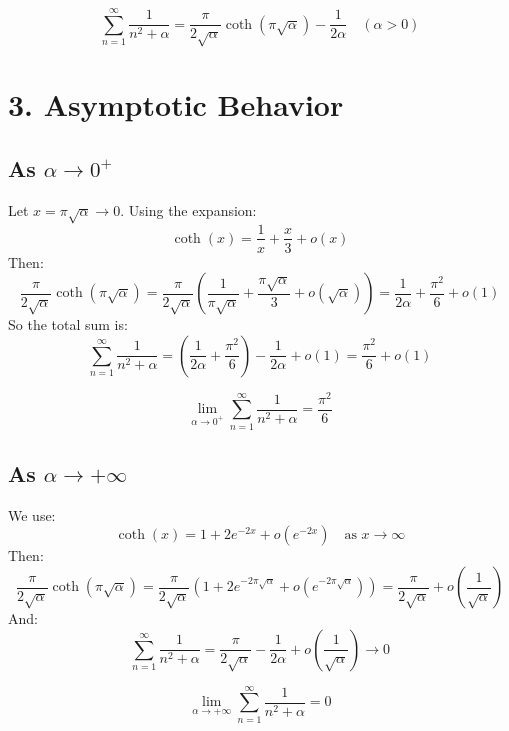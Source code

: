 \documentclass[a4paper,11pt]{article}
\begin{document}
\begin{tcolorbox}[colback=blue!5!white, colframe=blue!80!black, title=Final Result]
\[
\boxed{
\sum_{n=1}^{\infty} \frac{1}{n^2 + \alpha}
= \frac{\pi}{2\sqrt{\alpha}} \coth(\pi \sqrt{\alpha}) - \frac{1}{2\alpha}
\quad (\alpha > 0)
}
\]
\end{tcolorbox}

\section*{3. Asymptotic Behavior}

\subsection*{As \( \alpha \to 0^+ \)}

Let \( x = \pi \sqrt{\alpha} \to 0 \). Using the expansion:
\[
\coth(x) = \frac{1}{x} + \frac{x}{3} + o(x)
\]
Then:
\[
\frac{\pi}{2\sqrt{\alpha}} \coth(\pi \sqrt{\alpha})
= \frac{\pi}{2\sqrt{\alpha}} \left( \frac{1}{\pi \sqrt{\alpha}} + \frac{\pi \sqrt{\alpha}}{3} + o(\sqrt{\alpha}) \right)
= \frac{1}{2\alpha} + \frac{\pi^2}{6} + o(1)
\]
So the total sum is:
\[
\sum_{n=1}^{\infty} \frac{1}{n^2 + \alpha}
= \left( \frac{1}{2\alpha} + \frac{\pi^2}{6} \right) - \frac{1}{2\alpha} + o(1)
= \frac{\pi^2}{6} + o(1)
\]

\begin{tcolorbox}[colback=green!5!white, colframe=green!60!black, title=Limit as \( \alpha \to 0^+ \)]
\[
\boxed{
\lim_{\alpha \to 0^+} \sum_{n=1}^{\infty} \frac{1}{n^2 + \alpha} = \frac{\pi^2}{6}
}
\]
\end{tcolorbox}

\subsection*{As \( \alpha \to +\infty \)}

We use:
\[
\coth(x) = 1 + 2e^{-2x} + o(e^{-2x}) \quad \text{as } x \to \infty
\]
Then:
\[
\frac{\pi}{2\sqrt{\alpha}} \coth(\pi \sqrt{\alpha})
= \frac{\pi}{2\sqrt{\alpha}} \left( 1 + 2e^{-2\pi \sqrt{\alpha}} + o(e^{-2\pi \sqrt{\alpha}}) \right)
= \frac{\pi}{2\sqrt{\alpha}} + o\left(\frac{1}{\sqrt{\alpha}}\right)
\]
And:
\[
\sum_{n=1}^{\infty} \frac{1}{n^2 + \alpha}
= \frac{\pi}{2\sqrt{\alpha}} - \frac{1}{2\alpha} + o\left(\frac{1}{\sqrt{\alpha}}\right)
\to 0
\]

\begin{tcolorbox}[colback=green!5!white, colframe=green!60!black, title=Limit as \( \alpha \to +\infty \)]
\[
\boxed{
\lim_{\alpha \to +\infty} \sum_{n=1}^{\infty} \frac{1}{n^2 + \alpha} = 0
}
\]
\end{tcolorbox}
\end{document}

